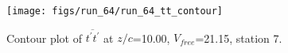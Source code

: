 \begin{figure}[H]
\centering
\texttt{[image: figs/run\_64/run\_64\_tt\_contour]}
\caption{Contour plot of $\overline{t^\prime t^\prime}$ at $z/c$=10.00, $V_{free}$=21.15, station 7.}
\end{figure}


